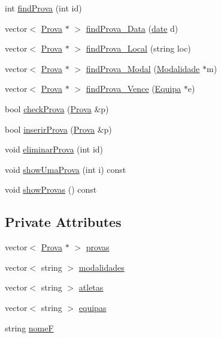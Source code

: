 \begin{DoxyCompactItemize}
\item 
int \hyperlink{class_calendario_a0232407ed153d613706113bad31d63ab}{find\+Prova} (int id)
\item 
vector$<$ \hyperlink{class_prova}{Prova} $\ast$ $>$ \hyperlink{class_calendario_acb99bce549da591f00766bde187c6ec2}{find\+Prova\+\_\+\+Data} (\hyperlink{structdate}{date} d)
\item 
vector$<$ \hyperlink{class_prova}{Prova} $\ast$ $>$ \hyperlink{class_calendario_a793b4bc54543406742b0fcd16bd95c26}{find\+Prova\+\_\+\+Local} (string loc)
\item 
vector$<$ \hyperlink{class_prova}{Prova} $\ast$ $>$ \hyperlink{class_calendario_a4213931fe492f55a4b6981c3dca02479}{find\+Prova\+\_\+\+Modal} (\hyperlink{class_modalidade}{Modalidade} $\ast$m)
\item 
vector$<$ \hyperlink{class_prova}{Prova} $\ast$ $>$ \hyperlink{class_calendario_a269e064b1ef6d757eff9b3bd185c6542}{find\+Prova\+\_\+\+Vence} (\hyperlink{class_equipa}{Equipa} $\ast$e)
\item 
bool \hyperlink{class_calendario_a912aa3dbadbdd82a002ccb251d5281fc}{check\+Prova} (\hyperlink{class_prova}{Prova} \&p)
\item 
bool \hyperlink{class_calendario_a625c94503c65e12e0999b2e022f364c5}{inserir\+Prova} (\hyperlink{class_prova}{Prova} \&p)
\item 
void \hyperlink{class_calendario_a113deec80be420c7d7aabb416fe2e763}{eliminar\+Prova} (int id)
\item 
void \hyperlink{class_calendario_ae65b9add220bbfdf1f029816333aa656}{show\+Uma\+Prova} (int i) const 
\item 
void \hyperlink{class_calendario_af6bfda8df20c96b8e77773de3da16cee}{show\+Provas} () const 
\end{DoxyCompactItemize}
\subsection*{Private Attributes}
\begin{DoxyCompactItemize}
\item 
vector$<$ \hyperlink{class_prova}{Prova} $\ast$ $>$ \hyperlink{class_calendario_a1c917a3325a0ebd6cbe186e976326d06}{provas}
\item 
vector$<$ string $>$ \hyperlink{class_calendario_a6a492724444ed6b468fe230d09fd800b}{modalidades}
\item 
vector$<$ string $>$ \hyperlink{class_calendario_abac0d74a48d544302a57fd3857ce3cf2}{atletas}
\item 
vector$<$ string $>$ \hyperlink{class_calendario_a4c49ca003a72d9d1aa32fcef57066467}{equipas}
\item 
string \hyperlink{class_calendario_ad14a413cc8b38380f6ea80f921cd16b4}{nome\+F}
\end{DoxyCompactItemize}


